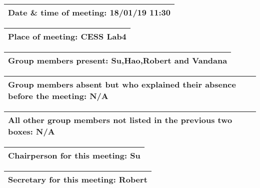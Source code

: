 \documentclass{article}
\begin{document}
\begin{table}[H]
	\centering
	\begin{tabular}{| p{12cm}  |}
	\hline
	Date \& time of meeting: 18/01/19 11:30\\ \hline
\end{tabular}
\end{table}

\begin{table}[H]
	\centering
	\begin{tabular}{| p{12cm}  |}
	\hline
	Place of meeting: CESS Lab4\\ \hline
\end{tabular}
\end{table}

\begin{table}[H]
	\centering
	\begin{tabular}{| p{12cm}  |}
	\hline
	Group members present: Su,Hao,Robert and Vandana\\ \hline
\end{tabular}
\end{table}

\begin{table}[H]
	\centering
	\begin{tabular}{| p{12cm}  |}
	\hline
	Group members absent but who explained their absence before the meeting: N/A\\ \hline
\end{tabular}
\end{table}

\begin{table}[H]
	\centering
	\begin{tabular}{| p{12cm}  |}
	\hline
	All other group members not listed in the previous two boxes: N/A\\ \hline
\end{tabular}
\end{table}

\begin{table}[H]
	\centering
	\begin{tabular}{| p{12cm}  |}
	\hline
	Chairperson for this meeting: Su\\ \hline
\end{tabular}
\end{table}

\begin{table}[H]
	\centering
	\begin{tabular}{| p{12cm}  |}
	\hline
	Secretary for this meeting:  Robert\\ \hline
\end{tabular}
\end{table}
\end{document}
